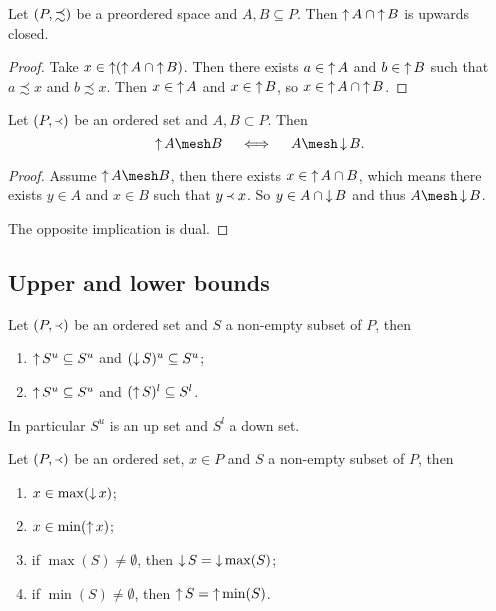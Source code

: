 \begin{lemma} \label{intersectionUpwardsClosedIsUpwardsClosed}
Let $\left( P, \precsim \right)$ be a preordered space and $A,B\subseteq P$. Then $\operatorname{\uparrow} A \cap \operatorname{\uparrow} B$ is upwards closed.
\end{lemma}
\begin{proof}
Take $x\in \operatorname{\uparrow}(\operatorname{\uparrow} A \cap \operatorname{\uparrow} B)$. Then there exists $a\in \operatorname{\uparrow} A$ and $b\in \operatorname{\uparrow} B$ such that $a\precsim x$ and $b\precsim x$. Then $x\in \operatorname{\uparrow} A$ and $x\in \operatorname{\uparrow} B$, so $x\in \operatorname{\uparrow} A \cap \operatorname{\uparrow} B$.
\end{proof}

\begin{lemma} \label{GaloisConnectionOrderClosure}
Let $\left( P, \Yleft \right)$ be an ordered set and $A,B \subset P$. Then
\[ \upset A \mesh B \quad\iff\quad A\mesh \downset B. \]
\end{lemma}
\begin{proof}
Assume $\upset A \mesh B$, then there exists $x\in \operatorname{\uparrow} A \cap B$, which means there exists $y\in A$ and $x\in B$ such that $y\Yleft x$. So $y\in A\cap \operatorname{\downarrow} B$ and thus $A\mesh \downset B$.

The opposite implication is dual.
\end{proof}

\subsection{Upper and lower bounds}

\begin{lemma} \label{upperBoundUpsetLowerBoundDownset}
Let $(P,\Yleft)$ be an ordered set and $S$ a non-empty subset of $P$, then
\begin{enumerate}
\item $\operatorname{\uparrow} S^u \subseteq S^u$ and $(\operatorname{\downarrow} S)^u \subseteq S^u$;
\item $\operatorname{\uparrow} S^u \subseteq S^u$ and $(\operatorname{\uparrow} S)^l \subseteq S^l$.
\end{enumerate}
\end{lemma}
In particular $S^u$ is an up set and $S^l$ a down set.
\begin{corollary} \label{minMaxUpsetDownset}
Let $(P,\Yleft)$ be an ordered set, $x\in P$ and $S$ a non-empty subset of $P$, then
\begin{enumerate}
\item $x \in \max(\operatorname{\downarrow} x)$;
\item $x \in \min(\operatorname{\uparrow} x)$;
\item if $\max(S)\neq \emptyset$, then $\operatorname{\downarrow} S = \operatorname{\downarrow} \max(S)$;
\item if $\min(S)\neq \emptyset$, then $\operatorname{\uparrow} S = \operatorname{\uparrow} \min(S)$.
\end{enumerate}
\end{corollary}



